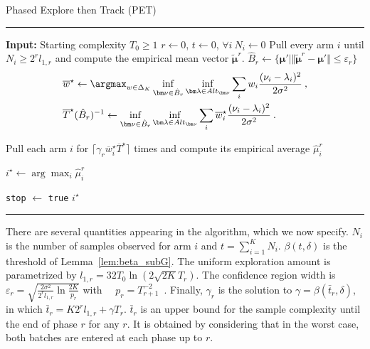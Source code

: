  \begin{algorithm}[ht]
 	\caption{Phased Explore then Track (PET)}
 	\label{alg:phased}
 \begin{algorithmic}[1]
 	\hrule
 		\STATE\textbf{Input:} Starting complexity $T_0 \ge 1$
% 		
 		\STATE $r\gets 0$, $t \gets 0$, $\forall i \ N_i \gets 0$
% 		
 		 \label{algl:chern}
% 		
 		\STATE Pull every arm $i$ until $N_i \ge 2^r l_{1,r}$ and compute the empirical mean vector $\tilde{\bm\mu}^r$.
%
 		\STATE $\hat{B}_r \gets \{\bm\mu' \mid \Vert \tilde{\bm\mu}^r - \bm\mu' \Vert \le \varepsilon_r\}$
% 		
		\vspace{-1.1em}
 		\begin{align*}
 		&\overline{w}^\star
 		\gets \argmax_{w\in \Delta_K} \inf_{\bm\nu \in \hat{B}_r} \inf_{\bm\lambda\in Alt_{\bm\nu}} \sum_i w_i \frac{(\nu_i -\lambda_i)^2}{2 \sigma^2}
 		\: , \\
 		&\overline{T}^\star(\hat{B}_r)^{-1}
 		\gets \inf_{\bm\nu \in \hat{B}_r} \inf_{\bm\lambda\in Alt_{\bm\nu}} \sum_i \overline{w}^\star_i \frac{(\nu_i -\lambda_i)^2}{2 \sigma^2}
 		\: .
 		\end{align*}
 		\vspace{-1.5em}
 		
 		 \label{algl:test}
 		
 		\STATE Pull each arm $i$ for $\lceil \gamma_r \overline{w}_i^\star \overline{T}^\star\rceil$ times and compute its empirical average $\hat{\mu}_i^r$ 
 		\ENDIF

 		\STATE $i^\star \gets \arg\max_i\hat{\mu}^r_i$

 		\STATE \texttt{stop} $\gets$ \texttt{true}
 		\ENDIF
 	\ENDWHILE
	\RETURN $i^\star$
	\hrule
\end{algorithmic}
\end{algorithm} 

There are several quantities appearing in the algorithm, which we now specify.
$N_i$ is the number of samples observed for arm $i$ and $t = \sum_{i=1}^K N_i$.
$\beta(t, \delta)$ is the threshold of Lemma~\ref{lem:beta_subG}. %
The uniform exploration amount is parametrized by $l_{1,r} = 32 T_0 \ln(2\sqrt{2K}T_r)$.
The confidence region width is $\varepsilon_r = \sqrt{\frac{2 \sigma^2}{2^r l_{1,r}} \ln\frac{2K}{p_r}}$ with $\quad p_r = T_{r+1}^{-2}$~.
Finally, $\gamma_r$ is the solution to $\gamma = \beta(\bar{t}_r, \delta)$, in which $\bar{t}_r = K 2^r l_{1,r} + \gamma T_r$.
$\bar{t}_r$ is an upper bound for the sample complexity until the end of phase $r$ for any $r$.
It is obtained by considering that in the worst case, both batches are entered at each phase up to $r$.

